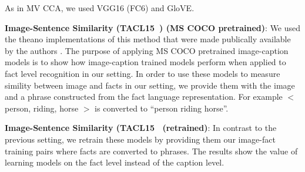 \documentclass[runningheads]{llncs}
\begin{document}
As in MV CCA,  we used VGG16 (FC6) and GloVE.
     \item \textbf{Image-Sentence Similarity (TACL15~\cite{kiros2014unifying}) (MS COCO pretrained)}: We used the theano implementations of this method that were made publically available by the authors \cite{tacl15_implementation}.
The purpose of applying MS COCO pretrained image-caption models is to show how image-caption trained models perform when applied to fact level recognition in our setting. In order to use these models to measure simility between image and facts in our setting, we provide them with the image and a phrase constructed from the fact language representation. For example $<$person, riding, horse $>$ is converted to ``person riding horse''.
\item \textbf{Image-Sentence Similarity (TACL15~\cite{kiros2014unifying} (retrained)}:  In contrast to the previous setting, we  retrain these models by providing them our image-fact training pairs where facts are converted to phrases. 
The results show the value of learning models on the fact level instead of the caption level. %
\begin{comment}
Note that ICLR16~\cite{vendrov2015order} is a very recent work (not yet presented) and although both our models and ~\cite{vendrov2015order} build uses VGG Network, the comparison is complicated since their main contribution is to use order-embedding loss instead of distance loss.  ICLR16~\cite{vendrov2015order} applies the method in TACL15~\cite{kiros2014unifying} but using their proposed order-embedding loss instead of the distance loss used in~\cite{kiros2014unifying}. We keep both the TACL15 and ICLR16 results in this paper as a guide since they are firstly applied in this setting while considering applying order-embedding loss to Model1 and 2 as future work. 
\end{comment}
\end{document}
